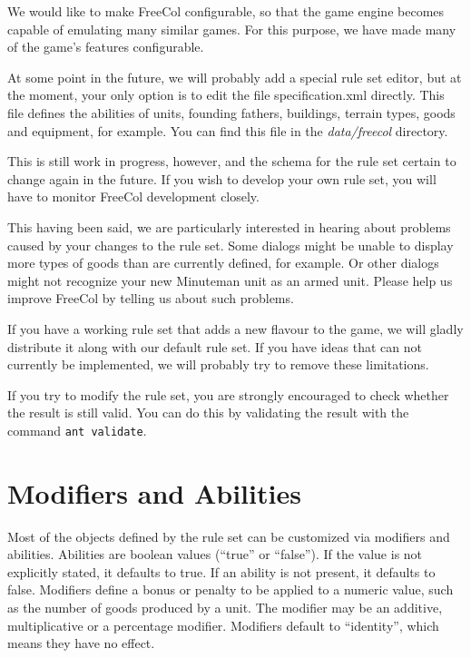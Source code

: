 \documentclass[12pt]{book}
\begin{document}
We would like to make FreeCol configurable, so that the game engine
becomes capable of emulating many similar games. For this purpose,
we have made many of the game's features configurable.

At some point in the future, we will probably add a special rule set
editor, but at the moment, your only option is to edit the file
specification.xml directly. This file defines the abilities of units,
founding fathers, buildings, terrain types, goods and equipment, for
example. You can find this file in the \textit{data/freecol} directory.

This is still work in progress, however, and the schema for the rule
set certain to change again in the future. If you wish to develop your
own rule set, you will have to monitor FreeCol development closely.

This having been said, we are particularly interested in hearing about
problems caused by your changes to the rule set. Some dialogs might be
unable to display more types of goods than are currently defined, for
example. Or other dialogs might not recognize your new Minuteman unit
as an armed unit. Please help us improve FreeCol by telling us about
such problems.

If you have a working rule set that adds a new flavour to the game, we
will gladly distribute it along with our default rule set. If you have
ideas that can not currently be implemented, we will probably try to
remove these limitations.

If you try to modify the rule set, you are strongly encouraged to
check whether the result is still valid. You can do this by validating
the result with the command \verb$ant validate$.


\hypertarget{Modifiers and Abilities}{\section{Modifiers and Abilities}}

Most of the objects defined by the rule set can be customized via
modifiers and abilities.  Abilities are boolean values (``true'' or
``false''). If the value is not explicitly stated, it defaults to
true. If an ability is not present, it defaults to false. Modifiers
define a bonus or penalty to be applied to a numeric value, such as
the number of goods produced by a unit. The modifier may be an
additive, multiplicative or a percentage modifier. Modifiers default
to ``identity'', which means they have no effect.
\end{document}
